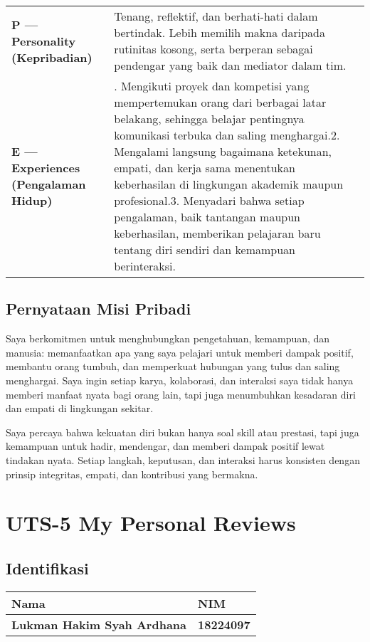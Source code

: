 \documentclass[
  letterpaper,
  DIV=11,
  numbers=noendperiod]{scrreprt}
\begin{document}
\begin{longtable}[]{@{}
  >{\raggedright\arraybackslash}p{}
  >{\raggedright\arraybackslash}p{}@{}}
\textbf{P --- Personality (Kepribadian)} & Tenang, reflektif, dan
berhati-hati dalam bertindak. Lebih memilih makna daripada rutinitas
kosong, serta berperan sebagai pendengar yang baik dan mediator dalam
tim. \\
\textbf{E --- Experiences (Pengalaman Hidup)} & 1. Mengikuti proyek dan
kompetisi yang mempertemukan orang dari berbagai latar belakang,
sehingga belajar pentingnya komunikasi terbuka dan saling menghargai.2.
Mengalami langsung bagaimana ketekunan, empati, dan kerja sama
menentukan keberhasilan di lingkungan akademik maupun profesional.3.
Menyadari bahwa setiap pengalaman, baik tantangan maupun keberhasilan,
memberikan pelajaran baru tentang diri sendiri dan kemampuan
berinteraksi. \\
\end{longtable}

\section{Pernyataan Misi Pribadi}\label{pernyataan-misi-pribadi}

Saya berkomitmen untuk menghubungkan pengetahuan, kemampuan, dan
manusia: memanfaatkan apa yang saya pelajari untuk memberi dampak
positif, membantu orang tumbuh, dan memperkuat hubungan yang tulus dan
saling menghargai. Saya ingin setiap karya, kolaborasi, dan interaksi
saya tidak hanya memberi manfaat nyata bagi orang lain, tapi juga
menumbuhkan kesadaran diri dan empati di lingkungan sekitar.

Saya percaya bahwa kekuatan diri bukan hanya soal skill atau prestasi,
tapi juga kemampuan untuk hadir, mendengar, dan memberi dampak positif
lewat tindakan nyata. Setiap langkah, keputusan, dan interaksi harus
konsisten dengan prinsip integritas, empati, dan kontribusi yang
bermakna.


\chapter{UTS-5 My Personal Reviews}\label{uts-5-my-personal-reviews}

\section{Identifikasi}\label{identifikasi}

\begin{longtable}[]{@{}ll@{}}
\toprule\noalign{}
Nama & NIM \\
\midrule\noalign{}
\endhead
\bottomrule\noalign{}
\endlastfoot
\textbf{Lukman Hakim Syah Ardhana} & \textbf{18224097} \\
\end{longtable}
\end{document}
